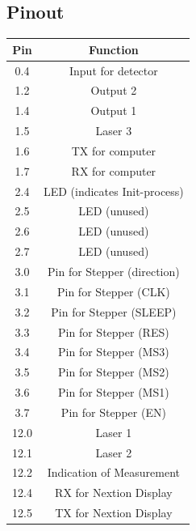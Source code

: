 	\subsection{Pinout}
	\begin{tabular}{|c|c|}
			\hline
			Pin & Function \\	
			\hline
			0.4 & Input for detector\\
			\hline
			\hline
			1.2 & Output 2 \\
			\hline
			1.4 & Output 1 \\
			\hline
			\hline
			1.5 & Laser 3 \\
			\hline
			\hline
			1.6 & TX for computer \\
			\hline
			1.7 & RX for computer \\
			\hline
			\hline
			2.4 & LED (indicates Init-process) \\
			\hline
			2.5 & LED (unused) \\
			\hline
			2.6 & LED (unused) \\
			\hline
			2.7 & LED (unused) \\
			\hline
			\hline
			3.0 & Pin for Stepper (direction) \\
			\hline
			3.1 & Pin for Stepper (CLK) \\
			\hline
			3.2 & Pin for Stepper (SLEEP) \\
			\hline
			3.3 & Pin for Stepper (RES) \\
			\hline
			3.4 & Pin for Stepper (MS3) \\
			\hline
			3.5 & Pin for Stepper (MS2) \\
			\hline
			3.6 & Pin for Stepper (MS1) \\
			\hline
			3.7 & Pin for Stepper (EN) \\
			\hline
			\hline
			12.0 & Laser 1 \\
			\hline
			12.1 & Laser 2 \\
			\hline
			\hline
			12.2 & Indication of Measurement \\
			\hline
			\hline
			12.4 & RX for Nextion Display \\
			\hline
			12.5 & TX for Nextion Display \\
			\hline
			
		\end{tabular}
	
	
